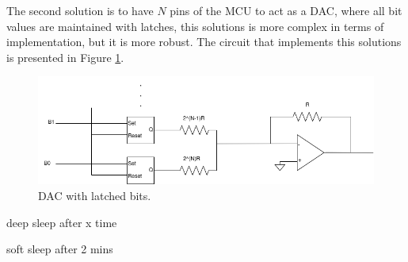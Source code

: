 The second solution is to have $N$ pins of the MCU to act as a DAC, where all bit values are maintained with latches, this solutions is more complex in terms of implementation, but it is more robust. The circuit that implements this solutions is presented in Figure \ref{fig:LatchDAC}.

\begin{figure}[H]
    \centering
    \includegraphics*[scale = 0.5]{Images/LatchCirc.png}
    \caption{DAC with latched bits.}
    \label{fig:LatchDAC}
\end{figure}

deep sleep after x time

soft sleep after 2 mins